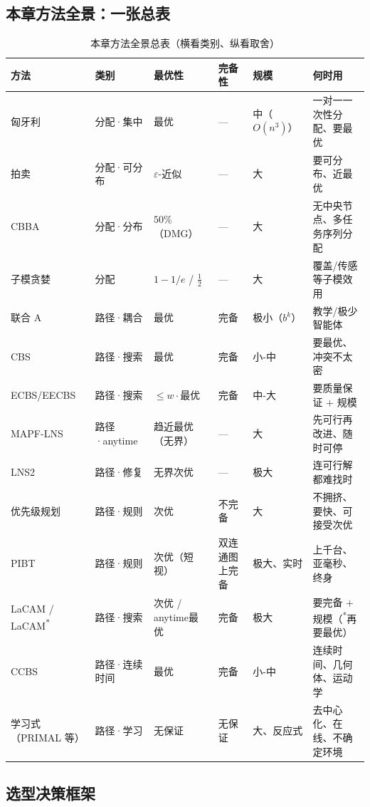 \subsection{本章方法全景：一张总表}
\label{sec:mapf-mastertable}

\begin{table}[H]\centering\small
\caption{本章方法全景总表（横看类别、纵看取舍）}
\label{tab:mapf-master}
\begin{tabular}{llllll}
\toprule
方法 & 类别 & 最优性 & 完备性 & 规模 & 何时用 \\
\midrule
匈牙利 & 分配·集中 & 最优 & --- & 中（$O(n^3)$） & 一对一一次性分配、要最优 \\
拍卖 & 分配·可分布 & $\varepsilon$-近似 & --- & 大 & 要可分布、近最优 \\
CBBA & 分配·分布 & $50\%$（DMG） & --- & 大 & 无中央节点、多任务序列分配 \\
子模贪婪 & 分配 & $1{-}1/e$ / $\tfrac12$ & --- & 大 & 覆盖/传感等子模效用 \\
联合 A\* & 路径·耦合 & 最优 & 完备 & 极小（$b^k$） & 教学/极少智能体 \\
CBS & 路径·搜索 & 最优 & 完备 & 小-中 & 要最优、冲突不太密 \\
ECBS/EECBS & 路径·搜索 & $\le w\cdot$最优 & 完备 & 中-大 & 要质量保证 $+$ 规模 \\
MAPF-LNS & 路径·anytime & 趋近最优（无界） & --- & 大 & 先可行再改进、随时可停 \\
LNS2 & 路径·修复 & 无界次优 & --- & 极大 & 连可行解都难找时 \\
优先级规划 & 路径·规则 & 次优 & 不完备 & 大 & 不拥挤、要快、可接受次优 \\
PIBT & 路径·规则 & 次优（短视） & 双连通图上完备 & 极大、实时 & 上千台、亚毫秒、终身 \\
LaCAM / LaCAM\textsuperscript{*} & 路径·搜索 & 次优 / anytime最优 & 完备 & 极大 & 要完备 $+$ 规模（\textsuperscript{*}再要最优） \\
CCBS & 路径·连续时间 & 最优 & 完备 & 小-中 & 连续时间、几何体、运动学 \\
学习式（PRIMAL 等） & 路径·学习 & 无保证 & 无保证 & 大、反应式 & 去中心化、在线、不确定环境 \\
\bottomrule
\end{tabular}
\end{table}

\subsection{选型决策框架}
\label{sec:mapf-selection}

